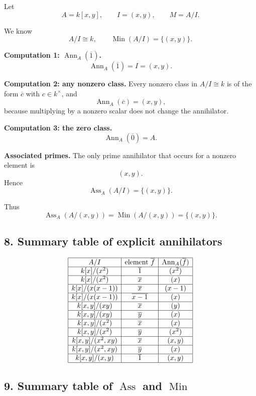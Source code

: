 \documentclass[12pt,a4paper]{article}
\theoremstyle{notespace}
\DeclareMathOperator{\Ass}{Ass}
\DeclareMathOperator{\Ann}{Ann}
\DeclareMathOperator{\Min}{Min}
\begin{document}
Let
\[
A=k[x,y],\qquad I=(x,y),\qquad M=A/I.
\]

We know
\[
A/I\cong k,
\qquad
\Min(A/I)=\{(x,y)\}.
\]

\textbf{Computation 1: \(\Ann_A(\overline 1)\).}
\[
\Ann_A(\overline 1)=I=(x,y).
\]

\textbf{Computation 2: any nonzero class.}
Every nonzero class in \(A/I\cong k\) is of the form \(\overline c\) with \(c\in k^\times\), and
\[
\Ann_A(\overline c)=(x,y),
\]
because multiplying by a nonzero scalar does not change the annihilator.

\textbf{Computation 3: the zero class.}
\[
\Ann_A(\overline 0)=A.
\]

\textbf{Associated primes.}
The only prime annihilator that occurs for a nonzero element is
\[
(x,y).
\]
Hence
\[
\Ass_A(A/I)=\{(x,y)\}.
\]

Thus
\[
\Ass_A(A/(x,y))=\Min(A/(x,y))=\{(x,y)\}.
\]

\subsection{8. Summary table of explicit annihilators}

\[
\begin{array}{|c|c|c|}
	\hline
	A/I & \text{element } \overline f & \Ann_A(\overline f) \\
	\hline
	k[x]/(x^2) & \overline 1 & (x^2) \\
	\hline
	k[x]/(x^2) & \overline x & (x) \\
	\hline
	k[x]/(x(x-1)) & \overline x & (x-1) \\
	\hline
	k[x]/(x(x-1)) & \overline{x-1} & (x) \\
	\hline
	k[x,y]/(xy) & \overline x & (y) \\
	\hline
	k[x,y]/(xy) & \overline y & (x) \\
	\hline
	k[x,y]/(x^2) & \overline x & (x) \\
	\hline
	k[x,y]/(x^2) & \overline y & (x^2) \\
	\hline
	k[x,y]/(x^2,xy) & \overline x & (x,y) \\
	\hline
	k[x,y]/(x^2,xy) & \overline y & (x) \\
	\hline
	k[x,y]/(x,y) & \overline 1 & (x,y) \\
	\hline
\end{array}
\]

\subsection{9. Summary table of \(\Ass\) and \(\Min\)}
\end{document}
